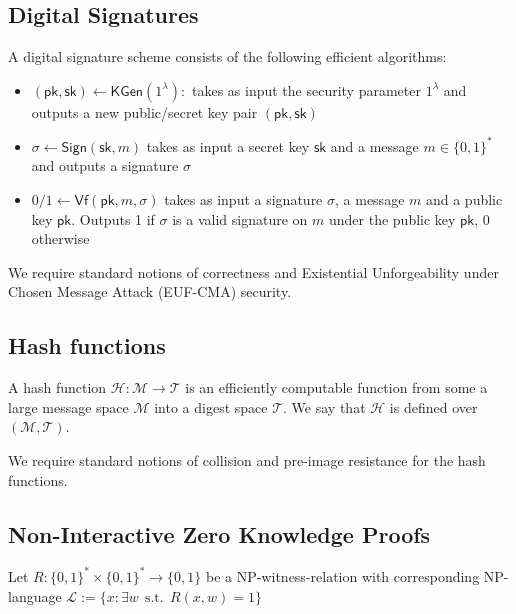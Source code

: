\documentclass{article}      	%
\begin{document}
\subsection{Digital Signatures}
A digital signature scheme consists of the following efficient algorithms: 
\begin{itemize}
    \item $(\mathsf{pk}, \mathsf{sk}) \gets \mathsf{KGen}(1^\lambda):$ takes as input the security parameter $1^\lambda$ and outputs a new public/secret key pair $(\mathsf{pk}, \mathsf{sk})$
    \item $\sigma \gets  \mathsf{Sign}(\mathsf{sk} , m)$ takes as input a secret key $\mathsf{sk}$ and a message $m \in \{0,1\}^*$ and outputs a signature $\sigma$
    \item $0/1 \gets \mathsf{Vf}(\mathsf{pk}, m, \sigma)$ takes as input a signature $\sigma$, a message $m$ and a public key $\mathsf{pk}$. Outputs 1 if $\sigma$ is a valid signature on $m$ under the public key $\mathsf{pk}$, 0 otherwise
\end{itemize}

We require standard notions of correctness and Existential Unforgeability under Chosen Message Attack (EUF-CMA) security.

\subsection{Hash functions}
A hash function $\mathcal{H} : \mathcal{M} \rightarrow \mathcal{T}$ is an efficiently computable function from some a large message space $\mathcal{M}$ into a digest space $\mathcal{T}$. We say that $\mathcal{H}$ is defined over $(\mathcal{M}, \mathcal{T})$.

We require standard notions of collision and pre-image resistance for the hash functions.

\subsection{Non-Interactive Zero Knowledge Proofs}

Let $R: \{0, 1\}^* \times \{0, 1\}^* \rightarrow \{0, 1\}$ be a NP-witness-relation with corresponding NP-language $\mathcal{L} := \{x : ∃w \:\: \text{s.t.} \:\: R(x, w) = 1\}$
\end{document}

